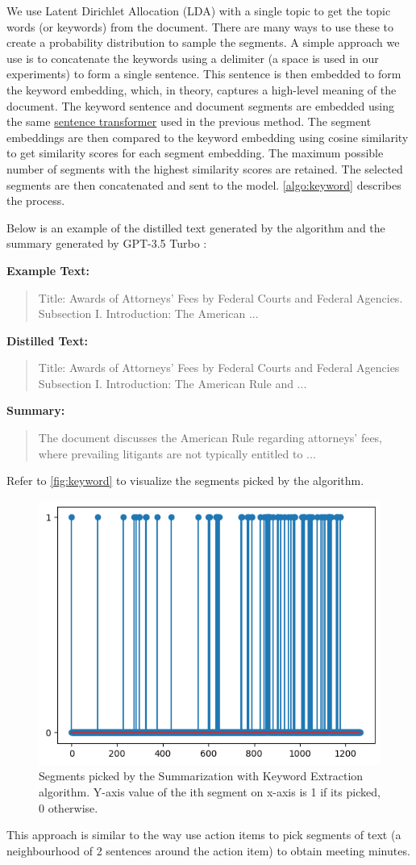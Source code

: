 		We use Latent Dirichlet Allocation (LDA) \cite{blei2003latent} with a single topic to get the
		topic words (or keywords) from the document.
		There are many ways to use these to create a probability distribution to sample the segments.
		A simple approach we use is to concatenate the keywords using a delimiter (a space is used in our
		experiments) to form a single sentence.
		This sentence is then embedded to form the keyword embedding, which, in theory, captures a
		high-level meaning of the document.
		The keyword sentence and document segments are embedded using the same
		\href{https://huggingface.co/sentence-transformers/all-MiniLM-L6-v2}{sentence transformer}
		used in the previous method.
		The segment embeddings are then compared to the keyword embedding using cosine similarity
		to get similarity scores for each segment embedding.
		The maximum possible number of segments with the highest similarity scores are retained.
		The selected segments are then concatenated and sent to the model.
		\autoref{algo:keyword} describes the process.

		Below is an example of the distilled text generated by the algorithm and the summary generated
		by GPT-3.5 Turbo \cite{brown2020language}:

		\noindent \textbf{Example Text:}
		\begin{quote}
			Title: Awards of Attorneys’ Fees by Federal Courts and Federal Agencies.
			Subsection I. Introduction: The American ...
		\end{quote}

		\noindent \textbf{Distilled Text:}
		\begin{quote}
			Title: Awards of Attorneys’ Fees by Federal Courts and Federal Agencies
			Subsection I. Introduction: The American Rule and ...
		\end{quote}

		\noindent \textbf{Summary:}
		\begin{quote}
			The document discusses the American Rule regarding attorneys' fees, where prevailing litigants are not typically entitled to ...
		\end{quote}

		Refer to \autoref{fig:keyword} to visualize the segments picked by the algorithm.

		\begin{figure}
			\centering
			\includegraphics*[width=.45\textwidth]{Images/keyword.png}
			\caption{
				Segments picked by the Summarization with Keyword Extraction algorithm.
				Y-axis value of the ith segment on x-axis is 1 if its picked, 0 otherwise.
			}
			\label{fig:keyword}
		\end{figure}

		This approach is similar to the way \citet{golia2024action} use action items to pick segments
		of text (a neighbourhood of 2 sentences around the action item) to obtain meeting minutes.
